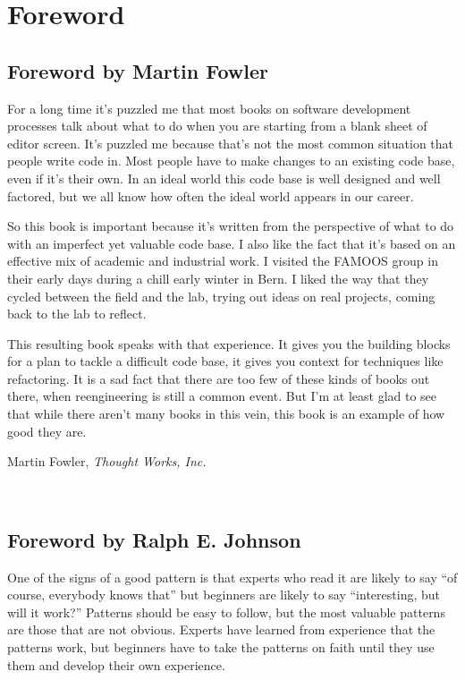 \documentclass[a4paper,10pt,twoside]{book}
\begin{document}
	\frontmatter
	\sloppy
\fi
\chapter{Foreword}

\section*{Foreword by Martin Fowler}

For a long time it's puzzled me that most books on software development processes talk about what to do when you are starting from a blank sheet of editor screen. It's puzzled me because that's not the most common situation that people write code in. Most people have to make changes to an existing code base, even if it's their own. In an ideal world this code base is well designed and well factored, but we all know how often the ideal world appears in our career.

So this book is important because it's written from the perspective of what to do with an imperfect yet valuable code base. I also like the fact that it's based on an effective mix of academic and industrial work. I visited the FAMOOS group in their early days during a chill early winter in Bern. I liked the way that they cycled between the field and the lab, trying out ideas on real projects, coming back to the lab to reflect.

This resulting book speaks with that experience. It gives you the building blocks for a plan to tackle a difficult code base, it gives you context for techniques like refactoring. It is a sad fact that there are too few of these kinds of books out there, when reengineering is still a common event. But I'm at least glad to see that while there aren't many books in this vein, this book is an example of how good they are.

\hfill Martin Fowler, \emph{Thought Works, Inc.}

\newpage
~
\vfill
\section*{Foreword by Ralph E. Johnson}

\noindent
One of the signs of a good pattern is that experts who read it are likely to say ``of course, everybody knows that'' but beginners are likely to say ``interesting, but will it work?''  Patterns should be easy to follow, but the most valuable patterns are those that are not obvious.  Experts have learned from experience that the patterns work, but beginners have to take the patterns on faith until they use them and develop their own experience.
\end{document}
